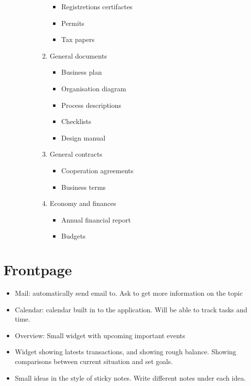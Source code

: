 \begin{enumerate}
\begin{enumerate}
\begin{enumerate}
\begin{enumerate}
\begin{itemize}
                    \item Registretions certifactes
                    \item Permits
                    \item Tax papers
                \end{itemize}
                \item General documents
                \begin{itemize}
                    \item Business plan
                    \item Organisation diagram
                    \item Process descriptions
                    \item Checklists
                    \item Design manual
                \end{itemize}
                \item General contracts
                \begin{itemize}
                    \item Cooperation agreements
                    \item Business terms
                \end{itemize}
                \item Economy and finances
                \begin{itemize}
                    \item Annual financial report
                    \item Budgets
                \end{itemize}
            \end{enumerate}
        \end{enumerate}
    \end{enumerate}
\end{enumerate}

\section{Frontpage}
\begin{itemize}
	\item Mail: automatically send email to. Ask to get more information on the topic
	\item Calendar: calendar built in to the application. Will be able to track tasks and time.
	\item Overview: Small widget with upcoming important events
	\item Widget showing latests transactions, and showing rough balance. Showing comparisons between current situation and set goals.
	\item Small ideas in the style of sticky notes. Write different notes under each idea.
\end{itemize}

